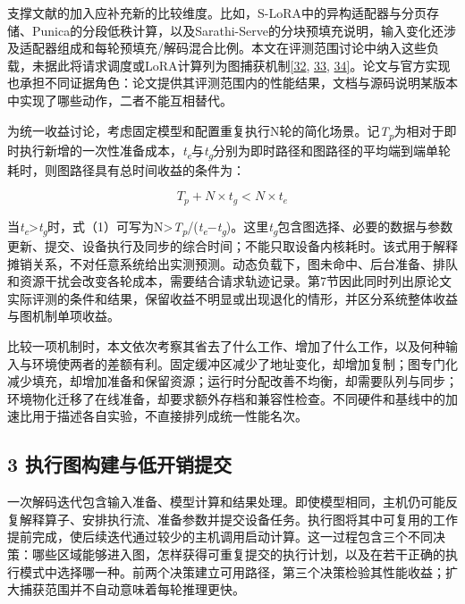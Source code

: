 \documentclass[UTF8,11pt,fontset=windows]{ctexart}
\begin{document}
支撑文献的加入应补充新的比较维度。比如，S-LoRA中的异构适配器与分页存储、Punica的分段低秩计算，以及Sarathi-Serve的分块预填充说明，输入变化还涉及适配器组成和每轮预填充/解码混合比例。本文在评测范围讨论中纳入这些负载，未据此将请求调度或LoRA计算列为图捕获机制\protect\hyperlink{ref-32}{{[}32}, \protect\hyperlink{ref-33}{33}, \protect\hyperlink{ref-34}{34{]}}。论文与官方实现也承担不同证据角色：论文提供其评测范围内的性能结果，文档与源码说明某版本中实现了哪些动作，二者不能互相替代。

为统一收益讨论，考虑固定模型和配置重复执行N轮的简化场景。记\emph{T\textsubscript{p}}为相对于即时执行新增的一次性准备成本，\emph{t\textsubscript{e}}与\emph{t\textsubscript{g}}分别为即时路径和图路径的平均端到端单轮耗时，则图路径具有总时间收益的条件为：

\hypertarget{equation-1}{}
\begin{equation}T_p+N\times t_g<N\times t_e\tag{1}\end{equation}

当\emph{t\textsubscript{e}}\textgreater{}\emph{t\textsubscript{g}}时，式（1）可写为N\textgreater{}\emph{T\textsubscript{p}}/(\emph{t\textsubscript{e}}−\emph{t\textsubscript{g}})。这里\emph{t\textsubscript{g}}包含图选择、必要的数据与参数更新、提交、设备执行及同步的综合时间；不能只取设备内核耗时。该式用于解释摊销关系，不对任意系统给出实测预测。动态负载下，图未命中、后台准备、排队和资源干扰会改变各轮成本，需要结合请求轨迹记录。第7节因此同时列出原论文实际评测的条件和结果，保留收益不明显或出现退化的情形，并区分系统整体收益与图机制单项收益。

比较一项机制时，本文依次考察其省去了什么工作、增加了什么工作，以及何种输入与环境使两者的差额有利。固定缓冲区减少了地址变化，却增加复制；图专门化减少填充，却增加准备和保留资源；运行时分配改善不均衡，却需要队列与同步；环境物化迁移了在线准备，却要求额外存档和兼容性检查。不同硬件和基线中的加速比用于描述各自实验，不直接排列成统一性能名次。

\hypertarget{section-3}{%
\subsection{3 执行图构建与低开销提交}\label{section-3}}

一次解码迭代包含输入准备、模型计算和结果处理。即使模型相同，主机仍可能反复解释算子、安排执行流、准备参数并提交设备任务。执行图将其中可复用的工作提前完成，使后续迭代通过较少的主机调用启动计算。这一过程包含三个不同决策：哪些区域能够进入图，怎样获得可重复提交的执行计划，以及在若干正确的执行模式中选择哪一种。前两个决策建立可用路径，第三个决策检验其性能收益；扩大捕获范围并不自动意味着每轮推理更快。
\end{document}
